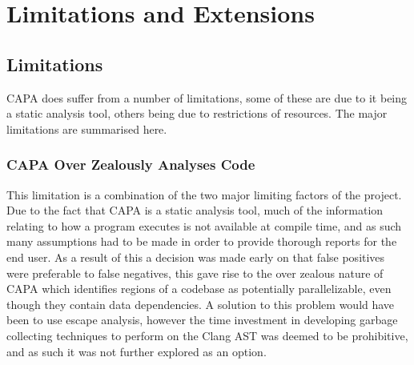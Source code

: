 
\section{Limitations and Extensions} %



\subsection{Limitations} %
CAPA does suffer from a number of limitations, some of these are due to it being a static analysis
tool, others being due to restrictions of resources. The major limitations are summarised here.

\subsubsection{CAPA Over Zealously Analyses Code}
This limitation is a combination of the two major limiting factors of the project. Due to the fact
that CAPA is a static analysis tool, much of the information relating to how a program executes is
not available at compile time, and as such many assumptions had to be made in order to provide
thorough reports for the end user. As a result of this a decision was made early on that false
positives were preferable to false negatives, this gave rise to the over zealous nature of CAPA
which identifies regions of a codebase as potentially parallelizable, even though they contain data
dependencies. A solution to this problem would have been to use escape analysis, however the time
investment in developing garbage collecting techniques to perform on the Clang AST was deemed to be
prohibitive, and as such it was not further explored as an option.

